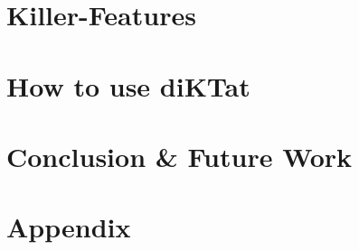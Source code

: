 \documentclass[acmlarge, screen, nonacm]{acmart}
\begin{document}
\section{Killer-Features}
\label{sec:feature}


\section{How to use diKTat}
\label{sec:download}


\section{Conclusion \& Future Work}
\label{sec:conclusion}


\newpage
\nocite{*}



\newpage
\section{Appendix}
\label{sec:appendix}

\end{document}
